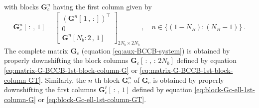 with blocks $\mathbf{G}_{c}^{n}$ having the first column given by
\begin{equation}
	\mathbf{G}_{c}^{n}[ \, : \, , \, 1] = \begin{bmatrix}
		\left( \mathbf{G}^{n}[ \, 1 \, , \, :] \right)^{\top} \\ 
		0 \\ 
		\mathbf{G}^{n}[ N_{b}:2 \, , \, 1 ]
	\end{bmatrix}_{2N_{b} \times 2N_{b}} \: , \quad n \in \{(1-N_{B}):(N_{B}-1)\} \: .
	\label{eq:block-Gc-ell-1st-column-GT}
\end{equation}
The complete matrix $\mathbf{G}_{c}$ (equation \ref{eq:aux-BCCB-system}) is obtained by properly downshifting 
the block columns $\mathbf{G}_{c}[ \, : \, , \, : \, 2N_{b}]$ defined by equation \ref{eq:matrix-G-BCCB-1st-block-column-G}
or \ref{eq:matrix-G-BCCB-1st-block-column-GT}.
Similarly, the $n$-th block $\mathbf{G}_{c}^{n}$ of $\mathbf{G}_{c}$ is obtained by properly
downshifting the first columns $\mathbf{G}_{c}^{\ell}[ \, : \, , \, 1]$ defined by equation  
\ref{eq:block-Gc-ell-1st-column-G} or \ref{eq:block-Gc-ell-1st-column-GT}.

